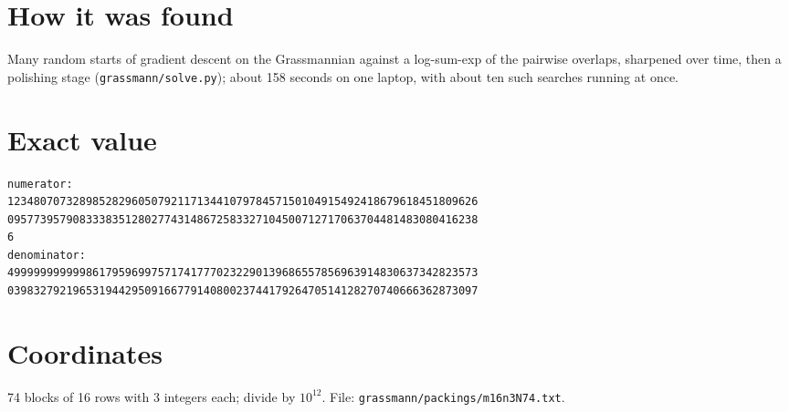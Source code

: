 \documentclass[11pt,a4paper]{article}
\begin{document}
\section{How it was found}
Many random starts of gradient descent on the Grassmannian against a log-sum-exp of the pairwise overlaps, sharpened over time, then a polishing stage (\texttt{grassmann/solve.py}); about 158 seconds on one laptop, with about ten such searches running at once.


\appendix
\section{Exact value}
{\small
\begin{verbatim}
numerator:
123480707328985282960507921171344107978457150104915492418679618451809626
095773957908333835128027743148672583327104500712717063704481483080416238
6
denominator:
499999999999861795969975717417770232290139686557856963914830637342823573
039832792196531944295091667791408002374417926470514128270740666362873097
\end{verbatim}}

\section{Coordinates}
74 blocks of 16 rows with 3 integers each; divide by $10^{12}$. File: \texttt{grassmann/packings/m16n3N74.txt}.
{\tiny
\begin{multicols}{3}
\end{multicols}}
\end{document}
